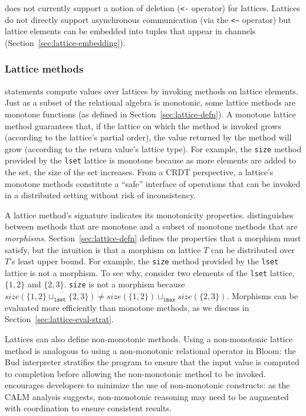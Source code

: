 \lang does not currently support a notion of deletion (\verb|<-| operator) for
lattices. Lattices do not directly support asynchronous communication (via the
\verb|<~| operator) but lattice elements can be embedded into tuples that appear
in channels (Section~\ref{sec:lattice-embedding}).

\subsubsection{Lattice methods}
\lang statements compute values over lattices by invoking methods on lattice
elements. Just as a subset of the relational algebra is monotonic, some lattice
methods are monotone functions (as defined in Section~\ref{sec:lattice-defn}). A
monotone lattice method guarantees that, if the lattice on which the method is
invoked grows (according to the lattice's partial order), the value returned by
the method will grow (according to the return value's lattice type). For
example, the \texttt{size} method provided by the \texttt{lset} lattice is
monotone because as more elements are added to the set, the size of the set
increases. From a CRDT perspective, a lattice's monotone methods constitute a
``safe'' interface of operations that can be invoked in a distributed setting
without risk of inconsistency.

A lattice method's signature indicates its monotonicity properties. \lang
distinguishes between methods that are monotone and a subset of monotone methods
that are \emph{morphisms}. Section~\ref{sec:lattice-defn} defines the properties
that a morphism must satisfy, but the intuition is that a morphism on lattice
$T$ can be distributed over $T$'s least upper bound. For example, the
\texttt{size} method provided by the \texttt{lset} lattice is not a morphism. To
see why, consider two elements of the \texttt{lset} lattice, $\{1,2\}$ and
$\{2,3\}$.  \texttt{size} is not a morphism because $size(\{1,2\}
\sqcup_{\mathtt{lset}} \{2,3\}) \ne size(\{1,2\}) \sqcup_{\mathtt{lmax}}
size(\{2,3\})$. Morphisms can be evaluated more efficiently than monotone
methods, as we discuss in Section~\ref{sec:lattice-eval-strat}.

Lattices can also define non-monotonic methods. Using a non-monotonic lattice
method is analogous to using a non-monotonic relational operator in Bloom: the
Bud interpreter stratifies the program to ensure that the input value is
computed to completion before allowing the non-monotonic method to be
invoked. \lang encourages developers to minimize the use of non-monotonic
constructs: as the CALM analysis suggests, non-monotonic reasoning may need to
be augmented with coordination to ensure consistent results.

